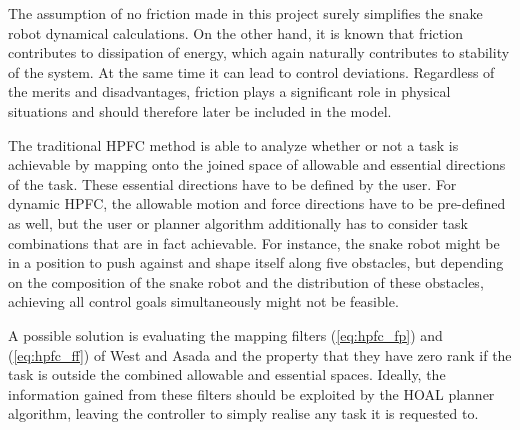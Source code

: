 The assumption of no friction made in this project surely simplifies the snake robot dynamical calculations. On the other hand, it is known that friction contributes to dissipation of energy, which again naturally contributes to stability of the system. At the same time it can lead to control deviations. Regardless of the merits and disadvantages, friction plays a significant role in physical situations and should therefore later be included in the model. 


The traditional HPFC method is able to analyze whether or not a task is achievable by mapping onto the joined space of allowable and essential directions of the task. These essential directions have to be defined by the user. For dynamic HPFC, the allowable motion and force directions have to be pre-defined as well, but the user or planner algorithm additionally has to consider task combinations that are in fact achievable. For instance, the snake robot might be in a position to push against and shape itself along five obstacles, but depending on the composition of the snake robot and the distribution of these obstacles, achieving all control goals simultaneously might not be feasible. 

A possible solution is evaluating the mapping filters (\ref{eq:hpfc_fp}) and (\ref{eq:hpfc_ff}) of West and Asada \cite{west1985method} and the property that they have zero rank if the task is outside the combined allowable and essential spaces. Ideally, the information gained from these filters should be exploited by the HOAL planner algorithm, leaving the controller to simply realise any task it is requested to.

